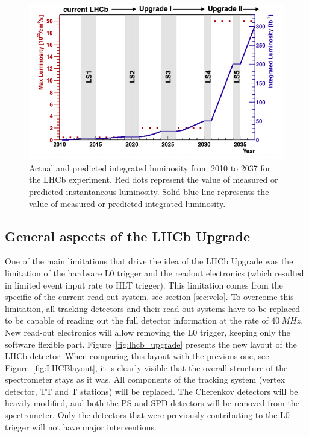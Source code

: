 \begin{figure}[!h]
\centering
\includegraphics[width=\linewidth]{figures/lhcb_lumi.PNG}
\caption{Actual and predicted integrated luminosity from 2010 to 2037 for the LHCb experiment. Red dots represent
the value of measured or predicted instantaneous luminosity. Solid blue line represents the value of measured or predicted integrated luminosity.
\label{fig:lhcb_lumi}}
\end{figure}


\subsection{General aspects of the LHCb Upgrade}

One of the main limitations that drive the idea of the LHCb Upgrade was the limitation of the hardware L0 trigger and the readout electronics (which resulted in limited event input rate to HLT trigger). This limitation comes from the specific of the current read-out system, see section \ref{sec:velo}.  To overcome this limitation, all tracking detectors and their read-out systems have to be replaced to be capable of reading out the full detector information at the rate of $40 ~MHz$. New read-out electronics will allow removing the L0 trigger, keeping only the software flexible part. Figure~\ref{fig:lhcb_upgrade} presents the new layout of the LHCb detector. When comparing this layout with the previous one, see Figure~\ref{fig:LHCBlayout}, it is clearly visible that the overall structure of the spectrometer stays as it was. All components of the tracking system (vertex detector, TT and T stations) will be replaced. The Cherenkov detectors will be heavily modified, and both the PS and SPD detectors will be removed from the spectrometer. Only the detectors that were previously contributing to the L0 trigger will not have major interventions. 

